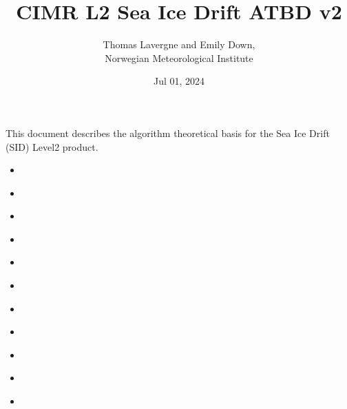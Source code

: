 \documentclass[letterpaper,10pt,english]{jupyterBook}
\title{CIMR L2 Sea Ice Drift ATBD v2}
\date{Jul 01, 2024}
\author{Thomas Lavergne and Emily Down, \\Norwegian Meteorological Institute}
\begin{document}
\pagestyle{empty}
\sphinxmaketitle
\pagestyle{plain}
\sphinxtableofcontents
\pagestyle{normal}
\label{\detokenize{intro::doc}}


\sphinxAtStartPar
This document describes the algorithm theoretical basis for the Sea Ice Drift (SID) Level\sphinxhyphen{}2 product.
\begin{itemize}
\item {} 
\sphinxAtStartPar
{\hyperref[\detokenize{abstract::doc}]{}}

\item {} 
\sphinxAtStartPar
{\hyperref[\detokenize{applicable_ref_docs::doc}]{}}

\item {} 
\sphinxAtStartPar
{\hyperref[\detokenize{acronyms::doc}]{}}

\item {} 
\sphinxAtStartPar
{\hyperref[\detokenize{definitions::doc}]{}}

\item {} 
\sphinxAtStartPar
{\hyperref[\detokenize{introduction_purpose_scope::doc}]{}}

\item {} 
\sphinxAtStartPar
{\hyperref[\detokenize{background_justification_algorithm::doc}]{}}

\item {} 
\sphinxAtStartPar
{\hyperref[\detokenize{L2_product_definition::doc}]{}}

\item {} 
\sphinxAtStartPar
{\hyperref[\detokenize{baseline_algorithm_definition::doc}]{}}

\item {} 
\sphinxAtStartPar
{\hyperref[\detokenize{algorithm_input_output_data_definition::doc}]{}}

\item {} 
\sphinxAtStartPar
{\hyperref[\detokenize{CIMR_L2_Sea_Ice_Drift_preproc::doc}]{}}

\item {} 
\sphinxAtStartPar
{\hyperref[\detokenize{CIMR_L2_Sea_Ice_Drift_algorithm::doc}]{}}


\end{itemize}
\end{document}
